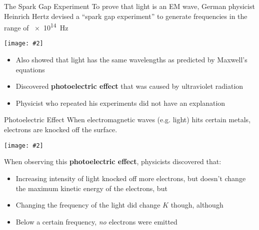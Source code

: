 \documentclass[12pt,compress,aspectratio=169]{beamer}
\newcommand{\pic}[2]{\texttt{[image: \#2]}}
\begin{document}
\begin{frame}{The Spark Gap Experiment}
  To prove that light is an EM wave, German physicist Heinrich Hertz devised a
  ``spark gap experiment'' to generate frequencies in the range of
  \SI{e14}{\hertz}
  \begin{center}
    \pic{.55}{Hertz_exp_2.png}
  \end{center}
  \begin{itemize}
  \item\vspace{-.1in}Also showed that light has the same wavelengths as
    predicted by Maxwell's equations
  \item Discovered \textbf{photoelectric effect} that was caused by ultraviolet
    radiation
  \item Physicist who repeated his experiments did not have an explanation
  \end{itemize}
\end{frame}


\begin{frame}{Photoelectric Effect}
  When electromagnetic waves (e.g. light) hits certain metals, electrons are
  knocked off the surface.
  \begin{center}
    \pic{.9}{73bacc9f2bf571752483a89ef6c61a94f07470f7.png}
  \end{center}
  When observing this \textbf{photoelectric effect}, physicists discovered that:
  \begin{itemize}
  \item Increasing intensity of light knocked off more electrons, but doesn't
    change the maximum kinetic energy of the electrons, but
  \item Changing the frequency of the light did change $K$ though, although
  \item Below a certain frequency, \emph{no} electrons were emitted
  \end{itemize}
\end{frame}
\end{document}
